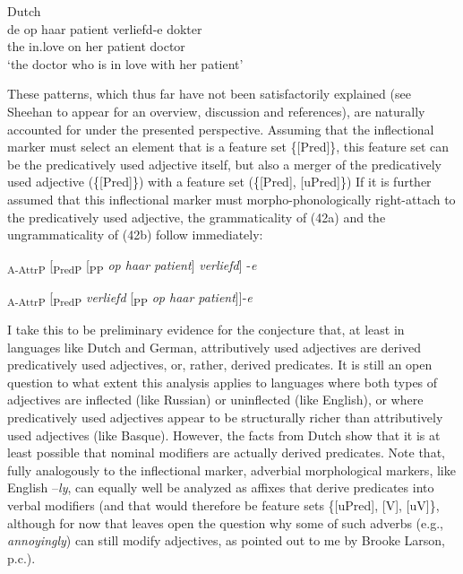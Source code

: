 \documentclass[output=paper
,modfonts
,nonflat]{langsci/langscibook}
\begin{document}
\begin{exe}
\ex Dutch \\
\gll de op haar patient verliefd-e dokter \\
	 the in.love on her patient doctor  \\
\glt‘the doctor who is in love with her patient’ 
\end{exe} 
These patterns, which thus far have not been satisfactorily explained (see Sheehan to appear for an overview, discussion and references), are naturally accounted for under the presented perspective. Assuming that the inflectional marker must select an element that is a feature set \{[Pred]\}, this feature set can be the predicatively used adjective itself, but also a merger of the predicatively used adjective (\{[Pred]\}) with a feature set (\{[Pred], [uPred]\}) If it is further assumed that this inflectional marker must morpho-phonologically right-attach to the predicatively used adjective, the grammaticality of (42a) and the ungrammaticality of (42b) follow immediately:

\begin{exe}
\ex
	\xlist
	\ex {\lbrack}\textsubscript{A-AttrP} [\textsubscript{PredP} [\textsubscript{PP} \textit{op haar patient}] \textit{verliefd}] -\textit{e}{\rbrack}
	
	\ex *{\lbrack}\textsubscript{A-AttrP} [\textsubscript{PredP} \textit{verliefd} [\textsubscript{PP} \textit{op haar patient}]]-\textit{e}{\rbrack}
	\endxlist
\end{exe}
I take this to be preliminary evidence for the conjecture that, at least in languages like Dutch and German, attributively used adjectives are derived predicatively used adjectives, or, rather, derived predicates. It is still an open question to what extent this analysis applies to languages where both types of adjectives are inflected (like Russian) or uninflected (like English), or where predicatively used adjectives appear to be structurally richer than attributively used adjectives (like Basque). However, the facts from Dutch show that it is at least possible that nominal modifiers are actually derived predicates. Note that, fully analogously to the inflectional marker, adverbial morphological markers, like English –\textit{ly}, can equally well be analyzed as affixes that derive predicates into verbal modifiers (and that would therefore be feature sets \{[uPred], [V], [uV]\}, although for now that leaves open the question why some of such adverbs (e.g., \textit{annoyingly}) can still modify adjectives, as pointed out to me by Brooke Larson, p.c.).
\end{document}
